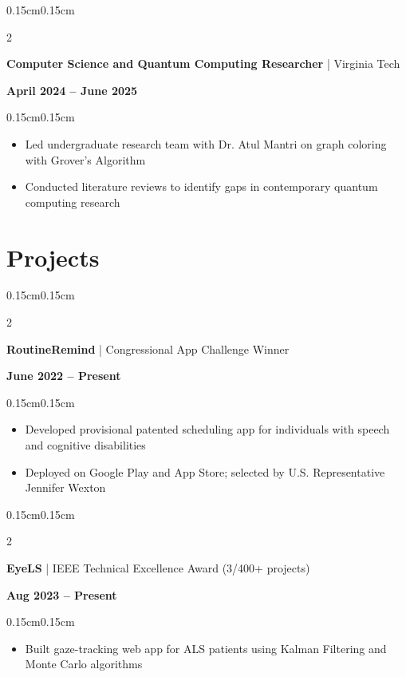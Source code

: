 \documentclass[10pt, letterpaper]{article}
\newenvironment{highlights}{
    \begin{itemize}[topsep=0pt, parsep=0pt, partopsep=0pt, itemsep=0pt, leftmargin=0.4cm]
}{
    \end{itemize}
}
\newenvironment{onecolentry}{
    \begin{adjustwidth}{0.15cm}{0.15cm}
}{
    \end{adjustwidth}
}
\newenvironment{twocolentry}[2][]{
    \onecolentry
    \def\secondColumn{#2}
    \setcolumnwidth{\fill, 4cm}
    \begin{paracol}{2}
}{
    \switchcolumn \raggedleft \secondColumn
    \end{paracol}
    \endonecolentry
}
\begin{document}
    \vspace{0.1cm}

    \begin{twocolentry}{\textbf{April 2024 -- June 2025}}
        \textbf{Computer Science and Quantum Computing Researcher} | Virginia Tech
    \end{twocolentry}

    \vspace{0.05cm}
    \begin{onecolentry}
        \begin{highlights}
            \item Led undergraduate research team with Dr. Atul Mantri on graph coloring with Grover's Algorithm
            \item Conducted literature reviews to identify gaps in contemporary quantum computing research
        \end{highlights}
    \end{onecolentry}

    \section{Projects}

    \begin{twocolentry}{\textbf{June 2022 -- Present}}
        \textbf{RoutineRemind} | Congressional App Challenge Winner
    \end{twocolentry}

    \vspace{0.05cm}
    \begin{onecolentry}
        \begin{highlights}
            \item Developed provisional patented scheduling app for individuals with speech and cognitive disabilities
            \item Deployed on Google Play and App Store; selected by U.S. Representative Jennifer Wexton
        \end{highlights}
    \end{onecolentry}

    \vspace{0.1cm}

    \begin{twocolentry}{\textbf{Aug 2023 -- Present}}
        \textbf{EyeLS} | IEEE Technical Excellence Award (3/400+ projects)
    \end{twocolentry}

    \vspace{0.05cm}
    \begin{onecolentry}
        \begin{highlights}
            \item Built gaze-tracking web app for ALS patients using Kalman Filtering and Monte Carlo algorithms
        \end{highlights}
    \end{onecolentry}
\end{document}
